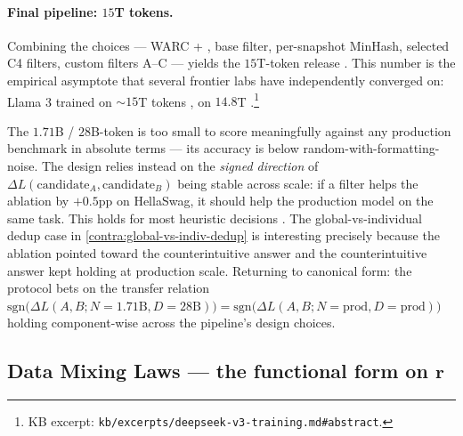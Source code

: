 \paragraph{Final pipeline: $15$T tokens.}
Combining the choices --- WARC + , base filter,
per-snapshot MinHash, selected C4 filters, custom filters A--C ---
yields the $15$T-token  release
\citep[\S 3.7]{fineweb2024}. This number is the empirical asymptote
that several frontier labs have independently converged on: Llama 3
trained on $\sim 15$T tokens \citep{meta-llama3},  on
$14.8$T \citep[abstract]{deepseek-v3}.\footnote{KB excerpt:
\nolinkurl{kb/excerpts/deepseek-v3-training.md#abstract}.}

\begin{intuition}
\label{intuit:ablation-meter}
The $1.71$B / $28$B-token  is too small to score
meaningfully against any production benchmark in absolute terms ---
its  accuracy is below random-with-formatting-noise. The design
relies instead on the \emph{signed direction} of
$\Delta L(\text{candidate}_A, \text{candidate}_B)$ being stable
across scale: if a filter helps the ablation by $+0.5$pp on
HellaSwag, it should help the production model on the same task.
This holds for most heuristic decisions \citep[\S 3.1]{fineweb2024}.
The global-vs-individual dedup case in
\cref{contra:global-vs-indiv-dedup} is interesting precisely because
the ablation pointed toward the counterintuitive answer and the
counterintuitive answer kept holding at production scale. Returning
to canonical form: the protocol bets on the transfer relation
$\mathrm{sgn}\bigl(\Delta L(A, B; N{=}1.71\text{B}, D{=}28\text{B})\bigr) =
\mathrm{sgn}\bigl(\Delta L(A, B; N{=}\text{prod}, D{=}\text{prod})\bigr)$
holding component-wise across the pipeline's design choices.
\end{intuition}

\subsection{Data Mixing Laws --- the functional form on $\mathbf{r}$}
\label{sec:data-mixing}

